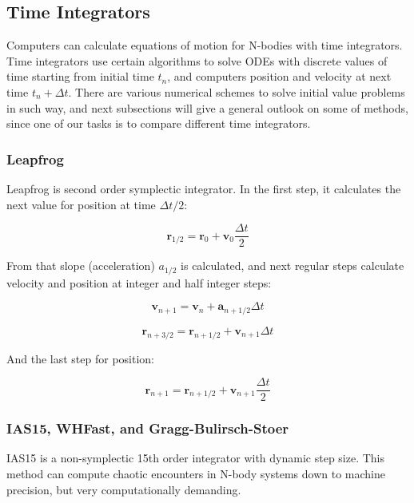 \documentclass[12pt,a4paper]{article}
\begin{document}
\subsection{Time Integrators}
Computers can calculate equations of motion for N-bodies with time integrators. Time integrators use certain algorithms to solve ODEs with discrete values of time starting from initial time $t_n$, and computers position and velocity at next time $t_n+\Delta t$. There are various numerical schemes to solve initial value problems in such way, and next subsections will give a general outlook on some of methods, since one of our tasks is to compare different time integrators.

\subsubsection{Leapfrog}

Leapfrog is second order symplectic integrator. In the first step, it calculates the next value for position at time $\Delta t/2$:

\begin{equation}
	\textbf{r}_{1/2} = \textbf{r}_0 + \textbf{v}_0 \frac{\Delta t}{2}
\end{equation}

From that slope (acceleration) $a_{1/2}$ is calculated, and next regular steps calculate velocity and position at integer and half integer steps:

\begin{equation}
	\textbf{v}_{n+1} = \textbf{v}_n + \textbf{a}_{n+1/2} \Delta t
\end{equation}

\begin{equation}
	\textbf{r}_{n+3/2} = \textbf{r}_{n+1/2} + \textbf{v}_{n+1} \Delta t
\end{equation}

And the last step for position:

\begin{equation}
	\textbf{r}_{n+1} = \textbf{r}_{n+1/2} + \textbf{v}_{n+1} \frac{\Delta t}{2}
\end{equation}

\subsubsection{IAS15, WHFast, and Gragg-Bulirsch-Stoer}

IAS15 is a non-symplectic 15th order integrator with dynamic step size. This method can compute chaotic encounters in N-body systems down to machine precision, but very computationally demanding.
\end{document}
